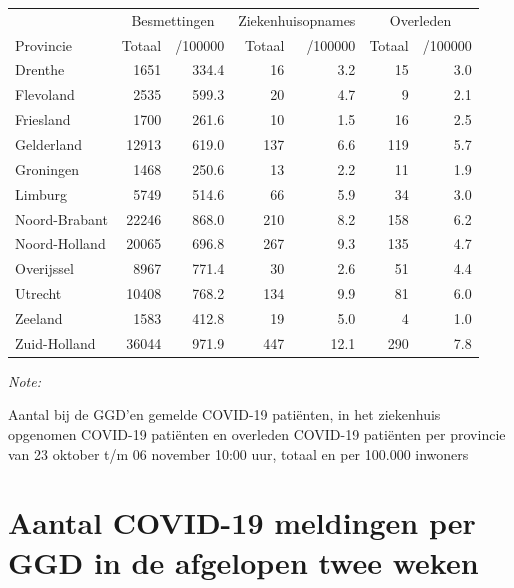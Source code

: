 \documentclass[
  english,
  man,floatsintext]{apa6}
\begin{document}
\begin{table}[H]
\centering
\begin{threeparttable}
\begin{tabular}{lrrrrrr}
\toprule
\multicolumn{1}{c}{ } & \multicolumn{2}{c}{Besmettingen} & \multicolumn{2}{c}{Ziekenhuisopnames} & \multicolumn{2}{c}{Overleden} \\
\cmidrule(l{3pt}r{3pt}){2-3} \cmidrule(l{3pt}r{3pt}){4-5} \cmidrule(l{3pt}r{3pt}){6-7}
Provincie & Totaal & /100000 & Totaal & /100000 & Totaal & /100000\\
\midrule
Drenthe & 1651 & 334.4 & 16 & 3.2 & 15 & 3.0\\
Flevoland & 2535 & 599.3 & 20 & 4.7 & 9 & 2.1\\
Friesland & 1700 & 261.6 & 10 & 1.5 & 16 & 2.5\\
Gelderland & 12913 & 619.0 & 137 & 6.6 & 119 & 5.7\\
Groningen & 1468 & 250.6 & 13 & 2.2 & 11 & 1.9\\
Limburg & 5749 & 514.6 & 66 & 5.9 & 34 & 3.0\\
Noord-Brabant & 22246 & 868.0 & 210 & 8.2 & 158 & 6.2\\
Noord-Holland & 20065 & 696.8 & 267 & 9.3 & 135 & 4.7\\
Overijssel & 8967 & 771.4 & 30 & 2.6 & 51 & 4.4\\
Utrecht & 10408 & 768.2 & 134 & 9.9 & 81 & 6.0\\
Zeeland & 1583 & 412.8 & 19 & 5.0 & 4 & 1.0\\
Zuid-Holland & 36044 & 971.9 & 447 & 12.1 & 290 & 7.8\\
\bottomrule
\end{tabular}
\begin{tablenotes}
\item \textit{Note: } 
\item Aantal bij de GGD’en gemelde COVID-19 patiënten, in het ziekenhuis opgenomen COVID-19 patiënten en overleden COVID-19 patiënten per provincie van 23 oktober t/m 06 november 10:00 uur, totaal en per 100.000 inwoners
\end{tablenotes}
\end{threeparttable}
\end{table}

\newpage

\hypertarget{aantal-covid-19-meldingen-per-ggd-in-de-afgelopen-twee-weken}{%
\section{Aantal COVID-19 meldingen per GGD in de afgelopen twee weken}\label{aantal-covid-19-meldingen-per-ggd-in-de-afgelopen-twee-weken}}
\end{document}
